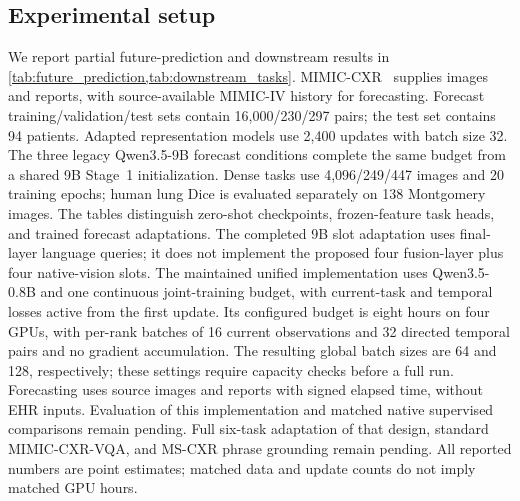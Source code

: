 \subsection{Experimental setup}
\label{sec:experiments}

We report partial future-prediction and downstream results in
\cref{tab:future_prediction,tab:downstream_tasks}. MIMIC-CXR~\citep{johnson2019mimiccxr}
supplies images and reports, with source-available MIMIC-IV history for forecasting.
Forecast training/validation/test sets contain 16,000/230/297 pairs; the test set
contains 94 patients. Adapted representation models use 2,400 updates with
batch size 32. The three legacy Qwen3.5-9B forecast conditions complete the same budget
from a shared 9B Stage~1 initialization. Dense tasks use 4,096/249/447 images and
20 training epochs; human lung Dice is evaluated separately on 138 Montgomery
images. The tables distinguish zero-shot checkpoints, frozen-feature task heads,
and trained forecast adaptations. The completed 9B slot adaptation uses final-layer
language queries; it does not implement the proposed four fusion-layer plus four
native-vision slots. The maintained unified implementation uses Qwen3.5-0.8B and one continuous
joint-training budget, with current-task and temporal losses active from the
first update. Its configured budget is eight hours on four GPUs, with per-rank
batches of 16 current observations and 32 directed temporal pairs and no gradient
accumulation. The resulting global batch sizes are 64 and 128, respectively;
these settings require capacity checks before a full run. Forecasting uses
source images and reports with signed elapsed time, without EHR inputs.
Evaluation of this implementation and matched native supervised comparisons
remain pending. Full six-task adaptation of that design, standard
MIMIC-CXR-VQA, and MS-CXR phrase grounding remain pending. All reported numbers
are point estimates; matched data and update counts do not imply matched GPU hours.
